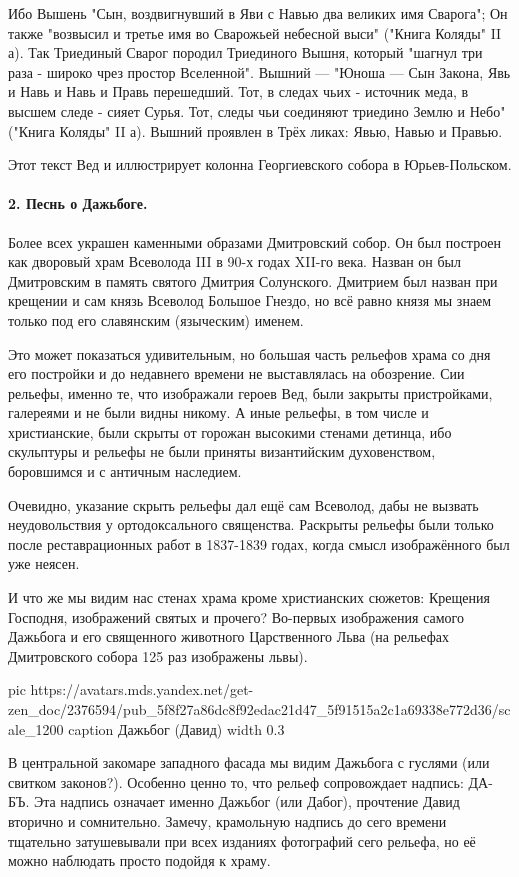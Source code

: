 Ибо Вышень "Сын, воздвигнувший в Яви с Навью два великих имя Сварога"; Он также
"возвысил и третье имя во Сварожьей небесной выси" ("Книга Коляды" II а). Так
Триединый Сварог породил Триединого Вышня, который "шагнул три раза - широко
чрез простор Вселенной". Вышний — "Юноша — Сын Закона, Явь и Навь и Навь и
Правь перешедший. Тот, в следах чьих - источник меда, в высшем следе - сияет
Сурья. Тот, следы чьи соединяют триедино Землю и Небо" ("Книга Коляды" II а).
Вышний проявлен в Трёх ликах: Явью, Навью и Правью.

Этот текст Вед и иллюстрирует колонна Георгиевского собора в Юрьев-Польском.

\paragraph{2. Песнь о Дажьбоге.}

Более всех украшен каменными образами Дмитровский собор. Он был построен как
дворовый храм Всеволода III в 90-х годах XII-го века. Назван он был Дмитровским
в память святого Дмитрия Солунского. Дмитрием был назван при крещении и сам
князь Всеволод Большое Гнездо, но всё равно князя мы знаем только под его
славянским (языческим) именем.

Это может показаться удивительным, но большая часть рельефов храма со дня его
постройки и до недавнего времени не выставлялась на обозрение. Сии рельефы,
именно те, что изображали героев Вед, были закрыты пристройками, галереями и не
были видны никому. А иные рельефы, в том числе и христианские, были скрыты от
горожан высокими стенами детинца, ибо скульптуры и рельефы не были приняты
византийским духовенством, боровшимся и с античным наследием.

Очевидно, указание скрыть рельефы дал ещё сам Всеволод, дабы не вызвать
неудовольствия у ортодоксального священства. Раскрыты рельефы были только после
реставрационных работ в 1837-1839 годах, когда смысл изображённого был уже
неясен.

И что же мы видим нас стенах храма кроме христианских сюжетов: Крещения
Господня, изображений святых и прочего? Во-первых изображения самого Дажьбога и
его священного животного Царственного Льва (на рельефах Дмитровского собора 125
раз изображены львы).

\ifcmt
pic https://avatars.mds.yandex.net/get-zen_doc/2376594/pub_5f8f27a86dc8f92edac21d47_5f91515a2c1a69338e772d36/scale_1200
caption Дажьбог (Давид)
  width 0.3
\fi

В центральной закомаре западного фасада мы видим Дажьбога с гуслями (или
свитком законов?). Особенно ценно то, что рельеф сопровождает надпись: ДА-БЪ.
Эта надпись означает именно Дажьбог (или Дабог), прочтение Давид вторично и
сомнительно. Замечу, крамольную надпись до сего времени тщательно затушевывали
при всех изданиях фотографий сего рельефа, но её можно наблюдать просто подойдя
к храму.

